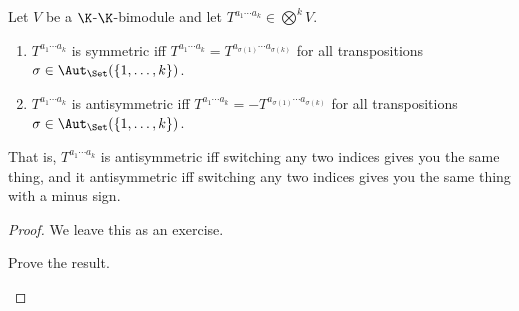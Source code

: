 \begin{prp}{}{}
	Let $V$ be a $\K$-$\K$-bimodule and let $T^{a_1\cdots a_k}\in \bigotimes ^kV$.
	\begin{enumerate}
		\item $T^{a_1\cdots a_k}$ is symmetric iff $T^{a_1\cdots a_k}=T^{a_{\sigma (1)}\cdots a_{\sigma (k)}}$ for all transpositions $\sigma \in \Aut _{\Set}(\{ 1,\ldots ,k\} )$.
		\item $T^{a_1\cdots a_k}$ is antisymmetric iff $T^{a_1\cdots a_k}=-T^{a_{\sigma (1)}\cdots a_{\sigma (k)}}$ for all transpositions $\sigma \in \Aut _{\Set}(\{ 1,\ldots ,k\} )$.
	\end{enumerate}
	\begin{rmk}
		That is, $T^{a_1\cdots a_k}$ is antisymmetric iff switching any two indices gives you the same thing, and it antisymmetric iff switching any two indices gives you the same thing with a minus sign.
	\end{rmk}
	\begin{proof}
		We leave this as an exercise.
		\begin{exr}[breakable=false]{}{}
			Prove the result.
		\end{exr}
	\end{proof}
\end{prp}

